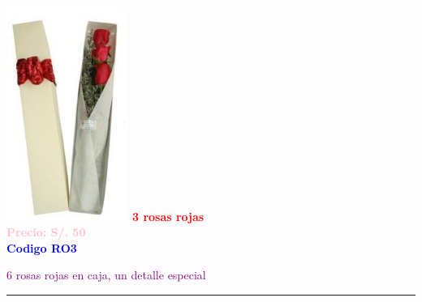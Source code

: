 \begin{multicols}{2}
    \begin{minipage}{\linewidth}
        \centering
        \includegraphics[height=7cm]{imagenes_extraidas/image_5_5} %
        \newline
        \vspace{0.1cm}
        \textbf{\Large \textcolor{red}{3 rosas rojas}} \\ %
        \vspace{0.2cm}
        \textbf{\textcolor{pink}{Precio: S/. 50}} \\ %
        \vspace{0.2cm}
        \textbf{\textcolor{blue}{Codigo RO3}} \\ %
        \vspace{0.2cm}
        \begin{minipage}{0.8\linewidth} 
            \small \textcolor{purple}{6 rosas rojas en caja, un detalle especial} %
        \end{minipage}
        \vspace{0.1cm}        
        \rule{\linewidth}{0.5pt}
    \end{minipage}
    \end{multicols}
\newpage


